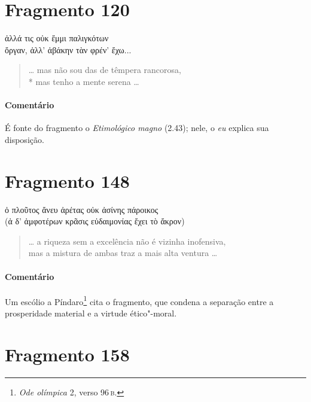 {\section{Fragmento 120}

\begin{gkverse}
ἀλλά τις οὐκ ἔμμι παλιγκότων\\
ὄργαν, ἀλλ’ ἀβάκην τὰν φρέν’ ἔχω...
\end{gkverse}

\begin{verse}
\ldots{} mas não sou das de têmpera rancorosa,\\*
mas tenho a mente serena \ldots{}
\end{verse}

\medskip

{\paragraph{Comentário} É fonte do fragmento o \textit{Etimológico magno} (2.43); nele, o \textit{eu} explica sua disposição.}


\section{Fragmento 148}

\begin{gkverse}
ὀ πλοῦτος ἄνευ ἀρέτας οὐκ ἀσίνης πάροικος\\
(ἀ δ’ ἀμφοτέρων κρᾶσις \dagger{}εὐδαιμονίας ἔχει τὸ ἄκρον\dagger{})
\end{gkverse}

\begin{verse}
\ldots{} a riqueza sem a excelência não é vizinha inofensiva,\\
mas a mistura de ambas traz a mais alta ventura \ldots{}
\end{verse}

\medskip

{\paragraph{Comentário} Um escólio a Píndaro\footnote{\textit{Ode olímpica} 2, verso 96\,\textsc{b}.} cita o fragmento,
que condena a separação entre a prosperidade material e a virtude ético"-moral.}

\pagebreak
\section{Fragmento 158}

}
